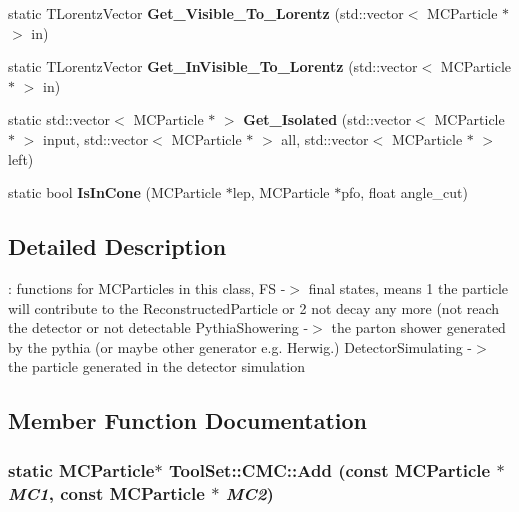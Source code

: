 \begin{DoxyCompactItemize}
\item 
\hypertarget{classToolSet_1_1CMC_a0754f20765709b34841b3c3aec8c7e51}{
static TLorentzVector {\bfseries Get\_\-Visible\_\-To\_\-Lorentz} (std::vector$<$ MCParticle $\ast$ $>$ in)}
\label{classToolSet_1_1CMC_a0754f20765709b34841b3c3aec8c7e51}

\item 
\hypertarget{classToolSet_1_1CMC_ab44cceb872950622551735a97a23bd4d}{
static TLorentzVector {\bfseries Get\_\-InVisible\_\-To\_\-Lorentz} (std::vector$<$ MCParticle $\ast$ $>$ in)}
\label{classToolSet_1_1CMC_ab44cceb872950622551735a97a23bd4d}

\item 
\hypertarget{classToolSet_1_1CMC_af7da55fa17ab746930f3a04eeb3014ef}{
static std::vector$<$ MCParticle $\ast$ $>$ {\bfseries Get\_\-Isolated} (std::vector$<$ MCParticle $\ast$ $>$ input, std::vector$<$ MCParticle $\ast$ $>$ all, std::vector$<$ MCParticle $\ast$ $>$ left)}
\label{classToolSet_1_1CMC_af7da55fa17ab746930f3a04eeb3014ef}

\item 
\hypertarget{classToolSet_1_1CMC_a4594f7a35f5db952f142626100ced91f}{
static bool {\bfseries IsInCone} (MCParticle $\ast$lep, MCParticle $\ast$pfo, float angle\_\-cut)}
\label{classToolSet_1_1CMC_a4594f7a35f5db952f142626100ced91f}

\end{DoxyCompactItemize}


\subsection{Detailed Description}
: functions for MCParticles in this class, FS -\/$>$ final states, means 1 the particle will contribute to the ReconstructedParticle or 2 not decay any more (not reach the detector or not detectable PythiaShowering -\/$>$ the parton shower generated by the pythia (or maybe other generator e.g. Herwig.) DetectorSimulating -\/$>$ the particle generated in the detector simulation 

\subsection{Member Function Documentation}
\hypertarget{classToolSet_1_1CMC_ad1b2172aaacc40d4f5971492a5d1a0f5}{
\subsubsection[{Add}]{\setlength{\rightskip}{0pt plus 5cm}static MCParticle$\ast$ ToolSet::CMC::Add (const MCParticle $\ast$ {\em MC1}, \/  const MCParticle $\ast$ {\em MC2})}}
\label{classToolSet_1_1CMC_ad1b2172aaacc40d4f5971492a5d1a0f5}


